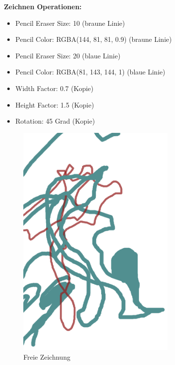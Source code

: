\textbf{Zeichnen Operationen:}
\begin{itemize}
	\item Pencil Eraser Size: 10 (braune Linie)
	\item Pencil Color: RGBA(144, 81, 81, 0.9) (braune Linie)
	\item Pencil Eraser Size: 20 (blaue Linie)
	\item Pencil Color: RGBA(81, 143, 144, 1) (blaue Linie)
	\item Width Factor: 0.7 (Kopie)
	\item Height Factor: 1.5 (Kopie)
	\item Rotation: 45 Grad (Kopie)
\end{itemize}

\begin{figure}[!htbp]
	\centering
	\includegraphics[width=0.7\textwidth]{"images/draw-ops.png"}
	\caption{Freie Zeichnung}
	\label{fig:draw-ops}
\end{figure}

